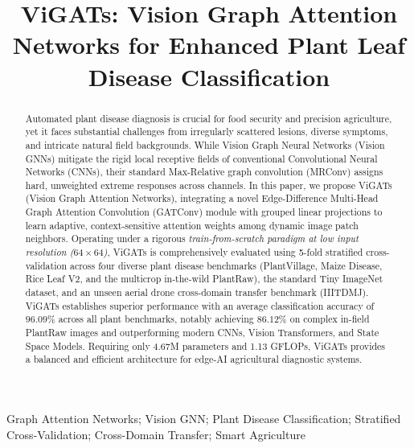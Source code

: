\documentclass[]{interact}
\theoremstyle{plain}
\theoremstyle{definition}
\theoremstyle{remark}
\begin{document}

\title{ViGATs: Vision Graph Attention Networks for Enhanced Plant Leaf Disease Classification}

\author{
}

\maketitle

\begin{abstract}
\color{blue}
Automated plant disease diagnosis is crucial for food security and precision agriculture, yet it faces substantial challenges from irregularly scattered lesions, diverse symptoms, and intricate natural field backgrounds. While Vision Graph Neural Networks (Vision GNNs) mitigate the rigid local receptive fields of conventional Convolutional Neural Networks (CNNs), their standard Max-Relative graph convolution (MRConv) assigns hard, unweighted extreme responses across channels. In this paper, we propose ViGATs (Vision Graph Attention Networks), integrating a novel Edge-Difference Multi-Head Graph Attention Convolution (GATConv) module with grouped linear projections to learn adaptive, context-sensitive attention weights among dynamic image patch neighbors. Operating under a rigorous \emph{train-from-scratch paradigm at low input resolution ($64 \times 64$)}, ViGATs is comprehensively evaluated using 5-fold stratified cross-validation across four diverse plant disease benchmarks (PlantVillage, Maize Disease, Rice Leaf V2, and the multicrop in-the-wild PlantRaw), the standard Tiny ImageNet dataset, and an unseen aerial drone cross-domain transfer benchmark (IIITDMJ). ViGATs establishes superior performance with an average classification accuracy of $96.09\%$ across all plant benchmarks, notably achieving $86.12\%$ on complex in-field PlantRaw images and outperforming modern CNNs, Vision Transformers, and State Space Models. Requiring only 4.67M parameters and 1.13 GFLOPs, ViGATs provides a balanced and efficient architecture for edge-AI agricultural diagnostic systems.
\color{black}
\end{abstract}

\begin{keywords}
Graph Attention Networks; Vision GNN; Plant Disease Classification; Stratified Cross-Validation; Cross-Domain Transfer; Smart Agriculture
\end{keywords}
\end{document}
